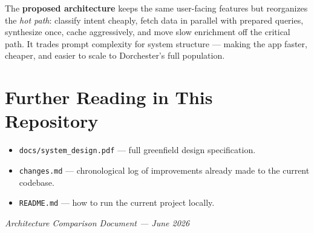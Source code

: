 \documentclass[11pt,a4paper]{article}
\begin{document}
The \textbf{proposed architecture} keeps the same user-facing features but reorganizes the \emph{hot path}: classify intent cheaply, fetch data in parallel with prepared queries, synthesize once, cache aggressively, and move slow enrichment off the critical path. It trades prompt complexity for system structure --- making the app faster, cheaper, and easier to scale to Dorchester's full population.

\section{Further Reading in This Repository}

\begin{itemize}[noitemsep]
  \item \texttt{docs/system\_design.pdf} --- full greenfield design specification.
  \item \texttt{changes.md} --- chronological log of improvements already made to the current codebase.
  \item \texttt{README.md} --- how to run the current project locally.
\end{itemize}

\vfill
\begin{center}
\small
\textit{Architecture Comparison Document --- June 2026}
\end{center}
\end{document}
